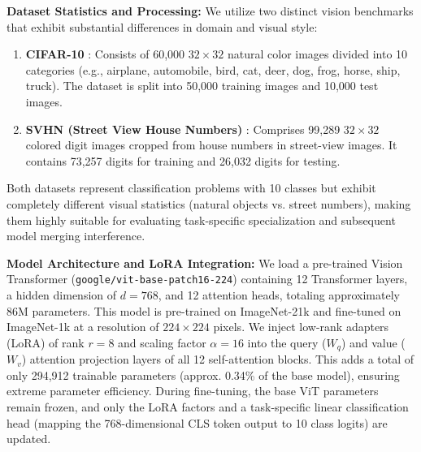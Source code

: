 \documentclass{article}
\begin{document}
\textbf{Dataset Statistics and Processing:}
We utilize two distinct vision benchmarks that exhibit substantial differences in domain and visual style:
\begin{enumerate}\setlength{\itemsep}{0pt}\setlength{\parsep}{0pt}
    \item \textbf{CIFAR-10} \cite{krizhevsky2009learning}: Consists of 60,000 $32\times32$ natural color images divided into 10 categories (e.g., airplane, automobile, bird, cat, deer, dog, frog, horse, ship, truck). The dataset is split into 50,000 training images and 10,000 test images.
    \item \textbf{SVHN (Street View House Numbers)} \cite{netzer2011reading}: Comprises 99,289 $32\times32$ colored digit images cropped from house numbers in street-view images. It contains 73,257 digits for training and 26,032 digits for testing. 
\end{enumerate}
Both datasets represent classification problems with 10 classes but exhibit completely different visual statistics (natural objects vs. street numbers), making them highly suitable for evaluating task-specific specialization and subsequent model merging interference.

\textbf{Model Architecture and LoRA Integration:}
We load a pre-trained Vision Transformer (\texttt{google/vit-base-patch16-224}) \cite{dosovitskiy2020image} containing 12 Transformer layers, a hidden dimension of $d=768$, and 12 attention heads, totaling approximately 86M parameters. This model is pre-trained on ImageNet-21k and fine-tuned on ImageNet-1k at a resolution of $224\times224$ pixels. We inject low-rank adapters (LoRA) \cite{hu2021lora} of rank $r=8$ and scaling factor $\alpha=16$ into the query ($W_q$) and value ($W_v$) attention projection layers of all 12 self-attention blocks. This adds a total of only 294,912 trainable parameters (approx. 0.34\% of the base model), ensuring extreme parameter efficiency. During fine-tuning, the base ViT parameters remain frozen, and only the LoRA factors and a task-specific linear classification head (mapping the 768-dimensional CLS token output to 10 class logits) are updated.
\end{document}
